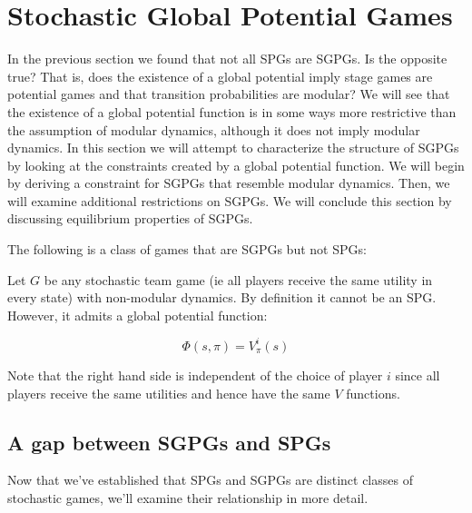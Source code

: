 \section{Stochastic Global Potential Games}
\label{sec:sgpg}

In the previous section we found that not all SPGs are SGPGs. Is the opposite true? That is, does the existence of a global potential imply stage games are potential games and that transition probabilities are modular? We will see that the existence of a global potential function is in some ways more restrictive than the assumption of modular dynamics, although it does not imply modular dynamics. In this section we will attempt to characterize the structure of SGPGs by looking at the constraints created by a global potential function. We will begin by deriving a constraint for SGPGs that resemble modular dynamics. Then, we will examine additional restrictions on SGPGs. We will conclude this section by discussing equilibrium properties of SGPGs.

The following is a class of games that are SGPGs but not SPGs:

\begin{eg}
Let $G$ be any stochastic team game (ie all players receive the same utility in every state) with non-modular dynamics. By definition it cannot be an SPG. However, it admits a global potential function:

$$
\Phi(s, \pi) = V^i_{\pi}(s)
$$

Note that the right hand side is independent of the choice of player $i$ since all players receive the same utilities and hence have the same $V$ functions.
\end{eg}

\subsection{A gap between SGPGs and SPGs}
\label{subsec:gap}

Now that we've established that SPGs and SGPGs are distinct classes of stochastic games, we'll examine their relationship in more detail. 



